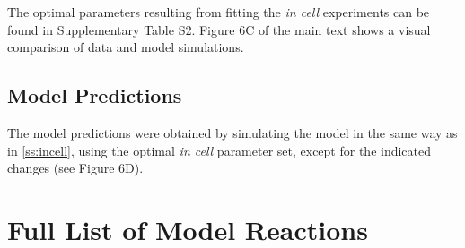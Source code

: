\documentclass[12pt]{article}
\begin{document}
	The optimal parameters resulting from fitting the \emph{in cell} experiments can be found in Supplementary Table S2. Figure 6C of the main text shows a visual comparison of data and model simulations.
	
	\subsection{Model Predictions}
	
	The model predictions were obtained by simulating the model in the
	same way as in \ref{ss:incell}, using the optimal \emph{in cell}
	parameter set, except for the indicated changes (see Figure 6D).
	
	\section{Full List of Model Reactions}
	\label{s:reactions}
\end{document}
